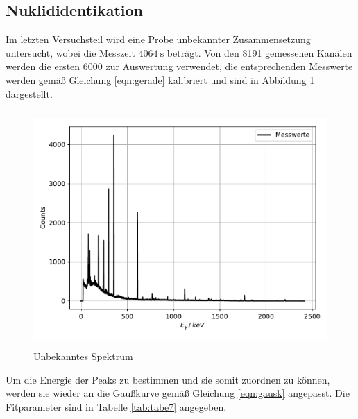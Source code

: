 \subsection{Nuklididentikation}
Im letzten Versuchsteil wird eine Probe unbekannter Zusammensetzung untersucht, wobei die
Messzeit $\SI{4064}{\second}$ beträgt. Von den 8191 gemessenen Kanälen werden die ersten 6000 zur Auswertung
verwendet, die entsprechenden Messwerte werden gemäß Gleichung \ref{eqn:gerade} kalibriert und
sind in Abbildung \ref{fig:plot8} dargestellt.
\begin{figure}
  \centering
  \includegraphics[height=9cm]{Un.pdf}
  \caption{Unbekanntes Spektrum}
  \label{fig:plot8}
\end{figure}

Um die Energie der Peaks zu bestimmen und sie somit zuordnen zu können, werden sie
wieder an die Gaußkurve gemäß Gleichung \ref{eqn:gausk} angepasst. Die Fitparameter sind in Tabelle
\ref{tab:tabe7} angegeben.

